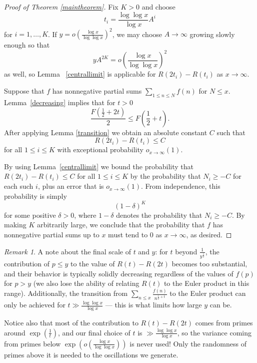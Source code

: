 \documentclass[12pt]{amsart}
\theoremstyle{remark}
\newtheorem{remark}[theorem]{Remark}
\theoremstyle{definition}
\theoremstyle{remark}
\numberwithin{equation}{section}
\begin{document}
\begin{proof}[Proof of Theorem \ref{maintheorem}]

Fix $K>0$ and choose
$$t_i = \frac{\log \log x}{ \log x} A^i$$ for $i = 1,\dots, K$. If $y = o \left(\frac{\log x}{\log \log x}\right)^2$, we may choose $A \rightarrow \infty$ growing slowly enough so that
$$yA^{2K} = o\left(\frac{\log x}{\log \log x}\right)^2$$ as well, so Lemma ~\ref{centrallimit} is applicable for $R(2t_i)-R(t_i)$ as $x \rightarrow \infty$.

Suppose that $f$ has nonnegative partial sums $\sum_{1\le n \le N}f(n)$ for $ N\le x$. Lemma~\ref{decreasing} implies that for $t>0$
$$\frac{F(\frac{1}{2}+2t)}{2} \le F(\frac{1}{2}+t).$$
After applying Lemma \ref{transition} we obtain an absolute constant $C$ such that $$R(2t_{i})-R(t_i) \le C$$ for all $1\le i \le K$ with exceptional probability $o_{x\to \infty}(1)$. 


By using Lemma~\ref{centrallimit} we bound the probability that $R(2t_{i})-R(t_i) \le C$ for all $1\le i \le K$ by the probability that $N_i \ge -C$ for each such $i$, plus an error that is $o_{x\to \infty}(1)$. From independence, this probability is simply $$(1-\delta)^K$$ for some positive $\delta>0$, where $1-\delta$ denotes the probability that $N_i \ge -C$. By making $K$ arbitrarily large, we conclude that the probability that $f$ has nonnegative partial sums up to $x$ must tend to $0$ as $x \rightarrow \infty$, as desired.

\end{proof}
\begin{remark}  
A note about the final scale of $t$ and $y$: for $t$ beyond $\frac{1}{y^{\frac{1}{2}}}$, the contribution of $p \le y$ to the value of $R(t)-R(2t)$ becomes too substantial, and their behavior is typically solidly decreasing regardless of the values of $f(p)$ for $p>y$ (we also lose the ability of relating $R(t)$ to the Euler product in this range). Additionally, the transition from $\sum_{n \le x} \frac{f(n)}{n^{\frac{1}{2}+t}}$ to the Euler product can only be achieved for $t \gg \frac{\log \log x}{\log x}$ --- this is what limits how large $y$ can be.

Notice also that most of the contribution to $R(t)-R(2t)$ comes from primes around $\exp(\frac{1}{t})$, and our final choice of $t$ is  $\gg \frac{\log \log x}{\log x}$, so the variance coming from primes below $\exp(o(\frac{\log x}{\log \log x}))$ is never used! Only the randomness of primes above it is needed to the oscillations we generate.


\end{remark}
\end{document}
